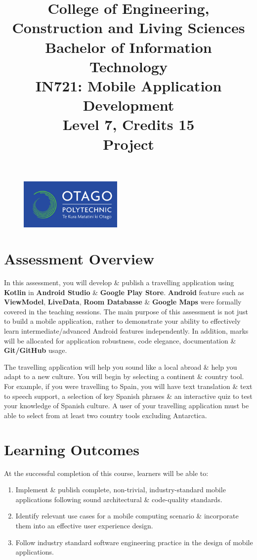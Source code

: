 \documentclass{article}
\author{}
\begin{document}
\begin{figure}
	\centering
	\includegraphics[width=50mm]{./img/logo.png}
\end{figure}

\title{College of Engineering, Construction and Living Sciences\\Bachelor of Information Technology\\IN721: Mobile Application Development\\Level 7, Credits 15\\\textbf{Project}}
\date{}
\maketitle

\section*{Assessment Overview}
In this assessment, you will develop \& publish a travelling application using \textbf{Kotlin} in \textbf{Android Studio} \& \textbf{Google Play Store}. \textbf{Android} feature such as \textbf{ViewModel}, \textbf{LiveData}, \textbf{Room Databasse} \& \textbf{Google Maps} were formally covered in the teaching sessions. The main purpose of this assessment is not just to build a mobile application, rather to demonstrate your ability to effectively learn intermediate/advanced Android features independently. In addition, marks will be allocated for application robustness, code elegance, documentation \& \textbf{Git/GitHub} usage.

The travelling application will help you sound like a local abroad \& help you adapt to a new culture. You will begin by selecting a continent \& country tool. For example, if you were travelling to Spain, you will have text translation \& text to speech support, a selection of key Spanish phrases \& an interactive quiz to test your knowledge of Spanish culture. A user of your travelling application must be able to select from at least two country tools excluding Antarctica.

\section*{Learning Outcomes}
At the successful completion of this course, learners will be able to: 
\begin{enumerate}
	\item Implement \& publish complete, non-trivial, industry-standard mobile applications following sound architectural \& code-quality standards.
	\item Identify relevant use cases for a mobile computing scenario \& incorporate them into an effective user experience design.
	\item Follow industry standard software engineering practice in the design of mobile applications.
\end{enumerate} 
\end{document}

